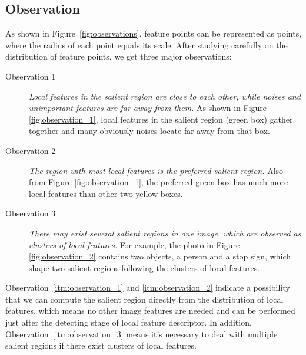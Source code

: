 \subsection{Observation}

As shown in Figure~\ref{fig:observations}, feature points can be represented as points, where the radius of each point equals its scale. After studying carefully on the distribution of feature points, we get three major observations:

\begin{description}
	
	\item[Observation 1]  \textit{Local features in the salient region are close to each other, while noises and unimportant features are far away from them.} As shown in Figure \ref{fig:observation_1}, local features in the salient region (green box) gather together and many obviously noises locate far away from that box. 

	\item[Observation 2]  \textit{The region with most local features is the preferred salient region.} Also from Figure \ref{fig:observation_1}, the preferred green box has much more local features than other two yellow boxes. 

	\item[Observation 3]  \textit{There may exist several salient regions in one image, which are observed as clusters of local features.} For example, the photo in Figure \ref{fig:observation_2} contains two objects, a person and a stop sign, which shape two salient regions following the clusters of local features.

\end{description}

Observation~\ref{itm:observation_1} and \ref{itm:observation_2} indicate a possibility that we can compute the salient region directly from the distribution of local features, which means no other image features are needed and can be performed just after the detecting stage of local feature descriptor. In addition, Observation~\ref{itm:observation_3} means it's necessary to deal with multiple salient regions if there exist clusters of local features.